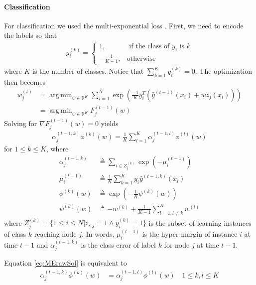\documentclass{article}
\DeclareMathOperator*{\argmin}{arg\,min}
\begin{document}
\paragraph{Classification}
For classification we used the multi-exponential loss 
\cite{zhu2009multiadaboost}. First, we need to encode the labels so that
\begin{align}\label{eq:MEencode}
y_i^{(k)} = \begin{cases}
1, &\text{ if the class of } y_i \text{ is } k \\
-\frac{1}{K-1}, &\text{otherwise}
\end{cases}
\end{align}
where $K$ is the number of classes. Notice that $\sum_{k=1}^{K} y_i^{(k)} = 0$.
The optimization then becomes
\begin{align}\label{eq:MEmin}
w_j^{(t)} &=  \argmin_{w \in \mathbb{R}^K} \sum_{i=1}^N \exp 
\left(\frac{-1}{K} y_i^T \left(\hat{y}^{(t-1)}(x_i) + w z_j(x_i) \right)\right) 
\\
&= \argmin_{w \in \mathbb{R}^K} F_j^{(t-1)}(w)
\end{align}
Solving for $\nabla F_j^{(t-1)}(w) = 0$ yields
\begin{align}\label{eq:MErawSol}
\alpha_j^{(t-1, k)}\phi^{(k)}(w) = \frac{1}{K} \sum_{l=1}^{K} \alpha_j^{(t-1, 
l)}\phi^{(l)}(w)
\end{align}
for $1 \leq k\leq K$, where
\begin{align}
\alpha_j^{(t-1, k)} &\triangleq \sum_{i \in Z_j^{(k)}} \exp \left( - 
\mu_i^{(t-1)} \right) \\
\mu_i^{(t-1)} &\triangleq \frac{1}{K} \sum_{k=1}^{K} y_i \hat{y}^{(t-1, 
k)}(x_i) \\
\phi^{(k)}(w) &\triangleq \exp \left( - \frac{1}{K} \psi^{(k)}(w) \right) \\
\psi^{(k)}(w) &\triangleq -w^{(k)} + \frac{1}{K-1} \sum_{l=1, l\neq k}^{K}  
w^{(l)}
\end{align}
where $Z_j^{(k)} = \{1 \leq i \leq N | z_{i,j} = 1 \wedge y_i^{(k)} = 1 \}$ is 
the subset of learning instances of class $k$ reaching node $j$. In words, 
$\mu_i^{(t-1)}$ is the hyper-margin of instance $i$ at time $t-1$ and 
$\alpha_j^{(t-1, k)}$ is the class error of label $k$ for node $j$ at time 
$t-1$.


Equation \ref{eq:MErawSol} is equivalent to
\begin{align}\label{eq:MEequation}
\alpha_j^{(t-1, k)}\phi^{(k)}(w) &= \alpha_j^{(t-1, l)}\phi^{(l)}(w) \quad 1 
\leq k,l \leq K
\end{align}
\end{document}
